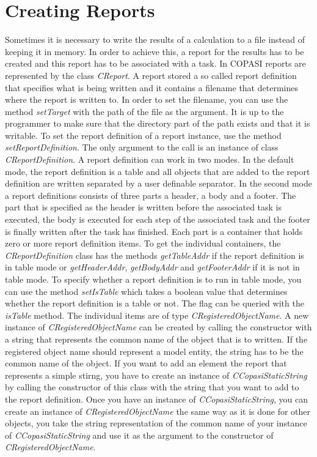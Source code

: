 \documentclass[a4,10pt]{article}
\begin{document}
\section{Creating Reports}
\label{CreatingReports}

Sometimes it is necessary to write the results of a calculation to a file instead of keeping it in memory. In order to achieve this, a report for the results has to be created and this report has to be associated with a task.
In COPASI reports are represented by the class \textit{CReport}. A report stored a so called report definition that specifies what is being written and it contains a filename that determines where the report is written to.
In order to set the filename, you can use the method \textit{setTarget} with the path of the file as the argument. It is up to the programmer to make sure that the directory part of the path exists and that it is writable.
To set the report definition of a report instance, use the method \textit{setReportDefinition}. The only argument to the call is an instance of class \textit{CReportDefinition}.
A report definition can work in two modes. In the default mode, the report definition is a table and all objects that are added to the report definition are written separated by a user definable separator.
In the second mode a report definitions consists of three parts a header, a body and a footer. The part that is specified as the header is written before the associated task is executed, the body is executed for each step of the associated task and the footer is finally written after the task has finished.
Each part is a container that holds zero or more report definition items. To get the individual containers, the \textit{CReportDefinition} class has the methods \textit{getTableAddr} if the report definition is in table mode or \textit{getHeaderAddr}, \textit{getBodyAddr} and \textit{getFooterAddr} if it is not in table mode.
To specify whether a report definition is to run in table mode, you can use the method \textit{setIsTable} which takes a boolean value that determines whether the report definition is a table or not. The flag can be queried with the \textit{isTable} method.
The individual items are of type \textit{CRegisteredObjectName}. A new instance of \textit{CRegisteredObjectName} can be created by calling the constructor with a string that represents the common name of the object that is to written.
If the registered object name should represent a model entity, the string has to be the common name of the object. If you want to add an element the report that represents a simple stirng, you have to create an instance of \textit{CCopasiStaticString} by calling the constructor of this class with the string that you want to add to the report definition. Once you have an instance of \textit{CCopasiStaticString}, you can create an instance of \textit{CRegisteredObjectName} the same way as it is done for other objects, you take the string representation of the common name of your instance of \textit{CCopasiStaticString} and use it as the argument to the constructor of \textit{CRegisteredObjectName}.
\end{document}
